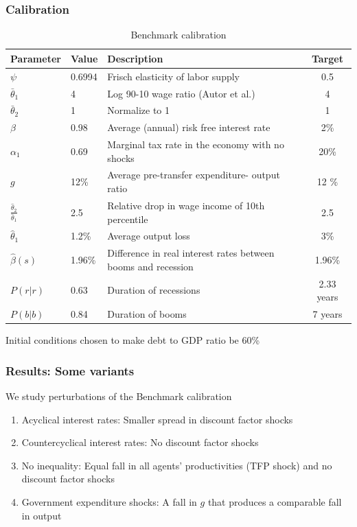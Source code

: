\documentclass{beamer}
\begin{document}
\begin{frame}
 \frametitle{Calibration}

{\tiny
\begin{table}[htp]
{\tiny
\begin{tabular}{|l|l|l|c|}
\hline
Parameter & Value & Description &Target   \\ \hline
$\psi$ & 0.6994 &Frisch elasticity of labor supply & 0.5   \\
$\bar{\theta}_1 $ & 4& Log 90-10 wage ratio (Autor et al.) & 4   \\
$\bar{\theta}_2 $ & 1 &Normalize to 1 & 1  \\
$\beta$ & 0.98  &Average (annual) risk free interest rate & 2\%   \\
$\alpha_1$ & 0.69 & Marginal tax rate in the economy with no shocks & 20\% \\
$g$ & 12\%&Average pre-transfer expenditure- output ratio & 12 \% \\
$\frac{\hat {\theta}_2}{\hat {\theta}_1}$ & 2.5 & Relative drop in wage income of 10th
percentile & 2.5\\
$\hat{\theta}_1$ & 1.2\% & Average output loss& 3\% \\
$\hat{\beta}(s)$ & 1.96\%& Difference in real interest rates between booms and recession& 1.96\% \\
$P(r|r)$ & 0.63&Duration of recessions & 2.33 years \\
$P(b|b)$ & 0.84 &Duration of booms &7 years \\ \hline
\end{tabular}
}
\caption{Benchmark calibration}
\label{tab:Parameters}
\end{table}
}
Initial conditions chosen to make  debt to GDP ratio be 60\%
 \end{frame}

\begin{frame}
 \frametitle{Results: Some variants }
 We study perturbations of the Benchmark calibration
 \begin{enumerate}
\item Acyclical interest rates: Smaller spread in discount factor shocks
\item Countercyclical interest rates: No discount factor shocks
\item No inequality: Equal fall in all agents' productivities (TFP shock) and no discount factor shocks
\item Government expenditure shocks: A fall in $g$ that produces a comparable fall in output
\end{enumerate}

 \end{frame}
\end{document}
